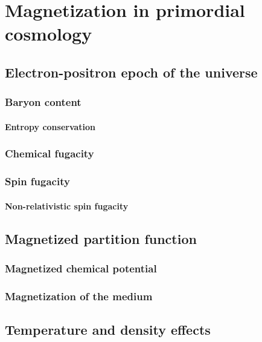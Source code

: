 \chapter{Magnetization in primordial cosmology}
    \section{Electron-positron epoch of the universe}
        \subsection{Baryon content}
            \subsubsection{Entropy conservation}
        \subsection{Chemical fugacity}
        \subsection{Spin fugacity}
            \subsubsection{Non-relativistic spin fugacity}
    \section{Magnetized partition function}
        \subsection{Magnetized chemical potential}
        \subsection{Magnetization of the medium}
    \section{Temperature and density effects}